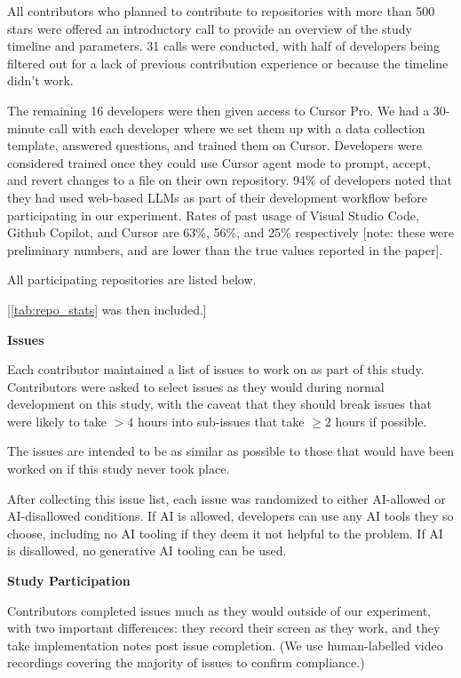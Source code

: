 \documentclass{article}
\begin{document}
\begin{instructionbox}
All contributors who planned to contribute to repositories with more than 500 stars were offered an introductory call to provide an overview of the study timeline and parameters. 31 calls were conducted, with half of developers being filtered out for a lack of previous contribution experience or because the timeline didn’t work.

The remaining 16 developers were then given access to Cursor Pro. We had a 30-minute call with each developer where we set them up with a data collection template, answered questions, and trained them on Cursor. Developers were considered trained once they could use Cursor agent mode to prompt, accept, and revert changes to a file on their own repository. 94\% of developers noted that they had used web-based LLMs as part of their development workflow before participating in our experiment. Rates of past usage of Visual Studio Code, Github Copilot, and Cursor are 63\%, 56\%, and 25\% respectively [note: these were preliminary numbers, and are lower than the true values reported in the paper].

All participating repositories are listed below.

[\autoref{tab:repo_stats} was then included.]

\textbf{Issues}

Each contributor maintained a list of issues to work on as part of this study. Contributors were asked to select issues as they would during normal development on this study, with the caveat that they should break issues that were likely to take $>4$ hours into sub-issues that take $\geq2$ hours if possible.

The issues are intended to be as similar as possible to those that would have been worked on if this study never took place.

After collecting this issue list, each issue was randomized to either AI-allowed or AI-disallowed conditions. If AI is allowed, developers can use any AI tools they so choose, including no AI tooling if they deem it not helpful to the problem. If AI is disallowed, no generative AI tooling can be used.

\textbf{Study Participation}

Contributors completed issues much as they would outside of our experiment, with two important differences: they record their screen as they work, and they take implementation notes post issue completion. (We use human-labelled video recordings covering the majority of issues to confirm compliance.)


\end{instructionbox}
\end{document}

